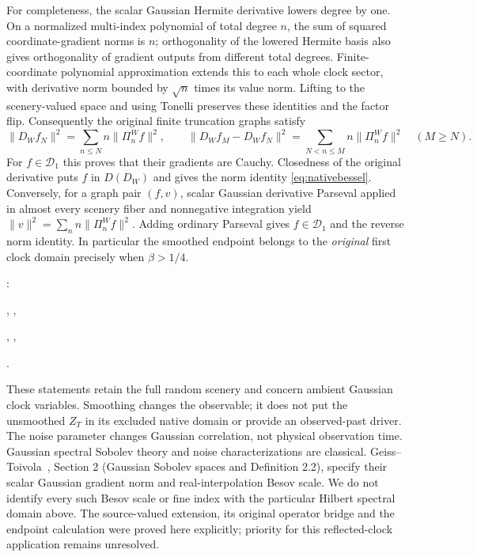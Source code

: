 \documentclass[11pt]{article}
\begin{document}
For completeness, the scalar Gaussian Hermite derivative lowers degree
by one. On a normalized multi-index polynomial of total degree $n$, the
sum of squared coordinate-gradient norms is $n$; orthogonality of the
lowered Hermite basis also gives orthogonality of gradient outputs from
different total degrees. Finite-coordinate polynomial approximation
extends this to each whole clock sector, with derivative norm bounded
by $\sqrt n$ times its value norm. Lifting to the scenery-valued space
and using Tonelli preserves these identities and the factor flip.
Consequently the original finite truncation graphs satisfy
\[
 \|D_W f_N\|^2=\sum_{n\leq N}n\|\Pi_n^Wf\|^2,
 \qquad
 \|D_Wf_M-D_Wf_N\|^2=\sum_{N<n\leq M}n\|\Pi_n^Wf\|^2
 \quad(M\geq N).
\]
For $f\in\mathcal D_1$ this proves that their gradients are Cauchy.
Closedness of the original derivative puts $f$ in $D(D_W)$ and gives
the norm identity \eqref{eq:nativebessel}. Conversely, for a graph pair
$(f,v)$, scalar Gaussian derivative Parseval applied in almost every
scenery fiber and nonnegative integration yield
$\|v\|^2=\sum_n n\|\Pi_n^Wf\|^2$. Adding ordinary Parseval gives
$f\in\mathcal D_1$ and the reverse norm identity.
In particular the smoothed endpoint belongs to the \emph{original}
first clock domain precisely when $\beta>1/4$.
\par\noindent{}:
\par\noindent{}, ,
\par\noindent{}, ,
\par\noindent{}.

These statements retain the full random scenery and concern ambient
Gaussian clock variables. Smoothing changes the observable; it does not
put the unsmoothed $Z_T$ in its excluded native domain or provide an
observed-past driver. The noise parameter changes Gaussian correlation,
not physical observation time. Gaussian spectral Sobolev theory and
noise characterizations are classical. Geiss--Toivola~\cite{geiss},
Section 2 (Gaussian Sobolev spaces and Definition 2.2), specify their
scalar Gaussian gradient norm and real-interpolation Besov scale.
We do not identify every such Besov scale or fine index with the
particular Hilbert spectral domain above. The source-valued extension,
its original operator bridge and the endpoint calculation were proved
here explicitly; priority for this reflected-clock application remains
unresolved.
\end{document}
